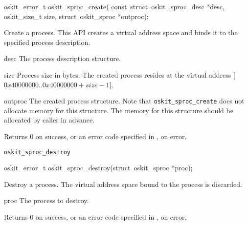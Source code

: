 \begin{apisyn}

        \funcproto oskit_error_t   oskit_sproc_create(
				   const~struct~oskit_sproc_desc *desc,
                                   oskit_size_t size,
                                   \outparam struct~oskit_sproc *outproc);
\end{apisyn}
\begin{apidesc}
        Create a process.  
        This API creates a virtual address space and binds it to the specified 
        process description.
\end{apidesc}
\begin{apiparm}
        \item[desc]
                The process description structure.

        \item[size] 
                Process size in bytes.  The created process resides at
                the virtual address [$0x40000000 .. 0x40000000+size-1$].

        \item[outproc]
                The created process structure.  Note that
                \texttt{oskit_sproc_create} does not allocate memory
                for this structure.  The memory for this structure
                should be allocated by caller in advance.

\end{apiparm}
\begin{apiret}
        Returns 0 on success, or an error code specified in
        , on error.
\end{apiret}
\begin{apirel}
        {\tt oskit_sproc_destroy}
\end{apirel}

\begin{apisyn}

        \funcproto oskit_error_t oskit_sproc_destroy(struct~oskit_sproc *proc);
\end{apisyn}
\begin{apidesc}
        Destroy a process.  The virtual address space bound to the process
        is discarded.
\end{apidesc}
\begin{apiparm}
        \item[proc]
          The process to destroy.  
\end{apiparm}
\begin{apiret}
        Returns 0 on success, or an error code specified in
        , on error.
\end{apiret}

